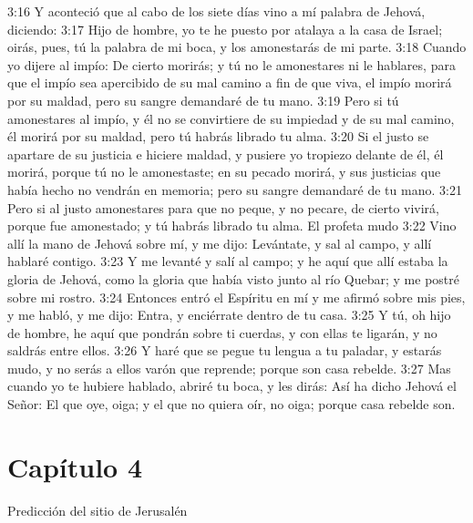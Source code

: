 3:16 Y aconteció que al cabo de los siete días vino a mí palabra de Jehová, diciendo:   
3:17 Hijo de hombre, yo te he puesto por atalaya a la casa de Israel; oirás, pues, tú la palabra de mi boca, y los amonestarás de mi parte.   
3:18 Cuando yo dijere al impío: De cierto morirás; y tú no le amonestares ni le hablares, para que el impío sea apercibido de su mal camino a fin de que viva, el impío morirá por su maldad, pero su sangre demandaré de tu mano.   
3:19 Pero si tú amonestares al impío, y él no se convirtiere de su impiedad y de su mal camino, él morirá por su maldad, pero tú habrás librado tu alma.   
3:20 Si el justo se apartare de su justicia e hiciere maldad, y pusiere yo tropiezo delante de él, él morirá, porque tú no le amonestaste; en su pecado morirá, y sus justicias que había hecho no vendrán en memoria; pero su sangre demandaré de tu mano.   
3:21 Pero si al justo amonestares para que no peque, y no pecare, de cierto vivirá, porque fue amonestado; y tú habrás librado tu alma.   
El profeta mudo   
3:22 Vino allí la mano de Jehová sobre mí, y me dijo: Levántate, y sal al campo, y allí hablaré contigo.   
3:23 Y me levanté y salí al campo; y he aquí que allí estaba la gloria de Jehová, como la gloria que había visto junto al río Quebar; y me postré sobre mi rostro.   
3:24 Entonces entró el Espíritu en mí y me afirmó sobre mis pies, y me habló, y me dijo: Entra, y enciérrate dentro de tu casa.   
3:25 Y tú, oh hijo de hombre, he aquí que pondrán sobre ti cuerdas, y con ellas te ligarán, y no saldrás entre ellos.   
3:26 Y haré que se pegue tu lengua a tu paladar, y estarás mudo, y no serás a ellos varón que reprende; porque son casa rebelde.   
3:27 Mas cuando yo te hubiere hablado, abriré tu boca, y les dirás: Así ha dicho Jehová el Señor: El que oye, oiga; y el que no quiera oír, no oiga; porque casa rebelde son.   
\section*{Capítulo 4  }
Predicción del sitio de Jerusalén   
  
